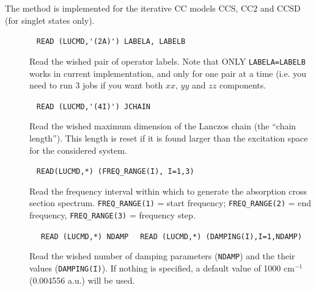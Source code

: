 The method is  implemented for the iterative CC models CCS, CC2 and CCSD (for 
singlet states only).

\begin{description}

\item[] \verb| |\newline
   \verb|READ (LUCMD,'(2A)') LABELA, LABELB|\newline

Read the wished pair of operator labels. Note that ONLY \verb|LABELA=LABELB| 
works in current implementation, and only for one pair at a time
(i.e. you need to run 3 jobs if you want both $xx$, $yy$ and $zz$ components.

\item[] \verb| |\newline
      \verb|READ (LUCMD,'(4I)') JCHAIN |\newline
      
Read the wished maximum dimension of the Lanczos chain (the ``chain length''). 
This length is reset if it is found larger than the 
excitation space for the considered system.      

\item[] \verb| |\newline
      \verb|READ(LUCMD,*) (FREQ_RANGE(I), I=1,3) |\newline
      
Read the  frequency interval within which to generate the absorption cross section spectrum.
\verb|FREQ_RANGE(1)| = start frequency;  \verb|FREQ_RANGE(2)| = end frequency, 
\verb|FREQ_RANGE(3)| = frequency step.

\item[] \verb| |\newline
      \verb| READ (LUCMD,*) NDAMP |\newline
      \verb| READ (LUCMD,*) (DAMPING(I),I=1,NDAMP) |\newline
      
Read the wished number of damping parameters (\verb|NDAMP|) and 
the their values (\verb|DAMPING(I)|). 
If nothing is specified, a default value of 1000 cm$^{-1}$ (0.004556 a.u.) 
will be used.

\item[] \verb| |\newline


\end{description}
